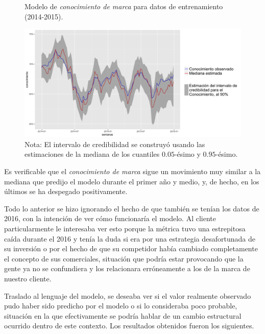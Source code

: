 \begin{figure}[H]
	\centering
	\caption{Modelo de \textit{conocimiento de marca} para datos de entrenamiento (2014-2015).}
	\includegraphics[width=1\textwidth]{Figures/MarketResearch/fit_review.png}
	\captionsetup{singlelinecheck=off,font=footnotesize}
	\caption*{Nota: El intervalo de credibilidad se construy\'o usando las estimaciones de la mediana de los cuantiles $0.05$-\'esimo y $0.95$-\'esimo.}
	\label{awareness_fit}
\end{figure}

Es verificable que el \textit{conocimiento de marca} sigue un movimiento muy similar a la mediana que predijo el modelo durante el primer año y medio, y, de hecho, en los \'ultimos se ha despegado positivamente.

Todo lo anterior se hizo ignorando el hecho de que tambi\'en se ten\'ian los datos de 2016, con la intenci\'on de ver c\'omo funcionar\'ia el modelo. Al cliente particularmente le interesaba ver esto porque la m\'etrica tuvo una estrepitosa ca\'ida durante el 2016 y ten\'ia la duda si era por una estrategia desafortunada de su inversi\'on o por el hecho de que su competidor hab\'ia cambiado completamente el concepto de sus comerciales, situaci\'on que podr\'ia estar provocando que la gente ya no se confundiera y los relacionara err\'oneamente a los de la marca de nuestro cliente.

Traslado al lenguaje del modelo, se deseaba ver si el valor realmente observado pudo haber sido predicho por el modelo o si lo consideraba poco probable, situaci\'on en la que efectivamente se podr\'ia hablar de un cambio estructural ocurrido dentro de este contexto. Los resultados obtenidos fueron los siguientes.

